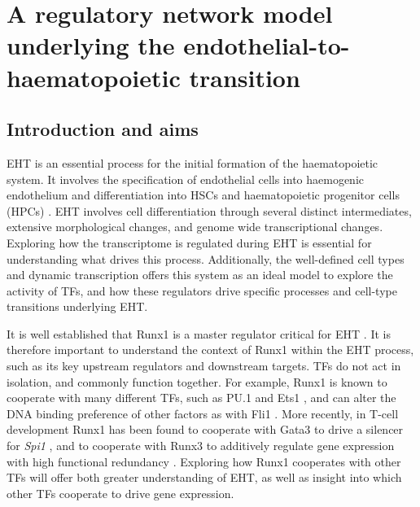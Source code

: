 
\chapter{\label{chapter3_EHT}A regulatory network model underlying the endothelial-to-haematopoietic transition}

\begingroup
\raggedright
\minitoc
\endgroup

\clearpage %

\section{Introduction and aims}

EHT is an essential process for the initial formation of the haematopoietic system. It involves the specification of endothelial cells into haemogenic endothelium and differentiation into HSCs and haematopoietic progenitor cells (HPCs) \citep{bertrand_haematopoietic_2010, boisset_vivo_2010, kissa_blood_2010}. EHT involves cell differentiation through several distinct intermediates, extensive morphological changes, and genome wide transcriptional changes. Exploring how the transcriptome is regulated during EHT is essential for understanding what drives this process. Additionally, the well-defined cell types and dynamic transcription offers this system as an ideal model to explore the activity of TFs, and how these regulators drive specific processes and cell-type transitions underlying EHT. 

It is well established that Runx1 is a master regulator critical for EHT \citep{cai_haploinsufficiency_2000, chen_runx1_2009, north_cbfa2_1999}. It is therefore important to understand the context of Runx1 within the EHT process, such as its key upstream regulators and downstream targets. TFs do not act in isolation, and commonly function together. For example, Runx1 is known to cooperate with many different TFs, such as PU.1 and Ets1 \citep{kim_mutual_1999, goetz_auto-inhibition_2000, hu_runx1_2011}, and can alter the DNA binding preference of other factors as with Fli1 \citep{lichtinger_runx1_2012}. More recently, in T-cell development Runx1 has been found to cooperate with Gata3 to drive a silencer for \textit{Spi1} \citep{hosokawa_stage-specific_2021}, and to cooperate with Runx3 to additively regulate gene expression with high functional redundancy \citep{shin_runx1_2021}. Exploring how Runx1 cooperates with other TFs will offer both greater understanding of EHT, as well as insight into which other TFs cooperate to drive gene expression. 

